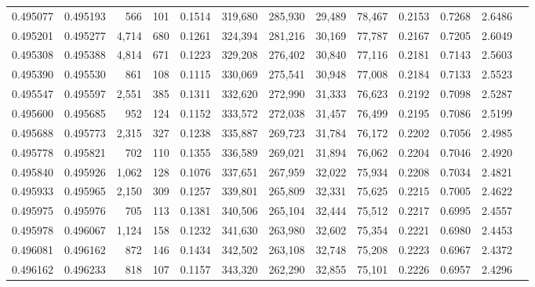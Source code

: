 \begin{tabular}{rrrrrrrrrrrrr}
0.495077 & 0.495193 &   566 &   101 &                                     0.1514 & 319,680 & 285,930 &  29,489 &  78,467 & 0.2153 & 0.7268 & 2.6486 \\
0.495201 & 0.495277 & 4,714 &   680 &                                     0.1261 & 324,394 & 281,216 &  30,169 &  77,787 & 0.2167 & 0.7205 & 2.6049 \\
0.495308 & 0.495388 & 4,814 &   671 &                                     0.1223 & 329,208 & 276,402 &  30,840 &  77,116 & 0.2181 & 0.7143 & 2.5603 \\
0.495390 & 0.495530 &   861 &   108 &                                     0.1115 & 330,069 & 275,541 &  30,948 &  77,008 & 0.2184 & 0.7133 & 2.5523 \\
0.495547 & 0.495597 & 2,551 &   385 &                                     0.1311 & 332,620 & 272,990 &  31,333 &  76,623 & 0.2192 & 0.7098 & 2.5287 \\
0.495600 & 0.495685 &   952 &   124 &                                     0.1152 & 333,572 & 272,038 &  31,457 &  76,499 & 0.2195 & 0.7086 & 2.5199 \\
0.495688 & 0.495773 & 2,315 &   327 &                                     0.1238 & 335,887 & 269,723 &  31,784 &  76,172 & 0.2202 & 0.7056 & 2.4985 \\
0.495778 & 0.495821 &   702 &   110 &                                     0.1355 & 336,589 & 269,021 &  31,894 &  76,062 & 0.2204 & 0.7046 & 2.4920 \\
0.495840 & 0.495926 & 1,062 &   128 &                                     0.1076 & 337,651 & 267,959 &  32,022 &  75,934 & 0.2208 & 0.7034 & 2.4821 \\
0.495933 & 0.495965 & 2,150 &   309 &                                     0.1257 & 339,801 & 265,809 &  32,331 &  75,625 & 0.2215 & 0.7005 & 2.4622 \\
0.495975 & 0.495976 &   705 &   113 &                                     0.1381 & 340,506 & 265,104 &  32,444 &  75,512 & 0.2217 & 0.6995 & 2.4557 \\
0.495978 & 0.496067 & 1,124 &   158 &                                     0.1232 & 341,630 & 263,980 &  32,602 &  75,354 & 0.2221 & 0.6980 & 2.4453 \\
0.496081 & 0.496162 &   872 &   146 &                                     0.1434 & 342,502 & 263,108 &  32,748 &  75,208 & 0.2223 & 0.6967 & 2.4372 \\
0.496162 & 0.496233 &   818 &   107 &                                     0.1157 & 343,320 & 262,290 &  32,855 &  75,101 & 0.2226 & 0.6957 & 2.4296 \\

\end{tabular}
